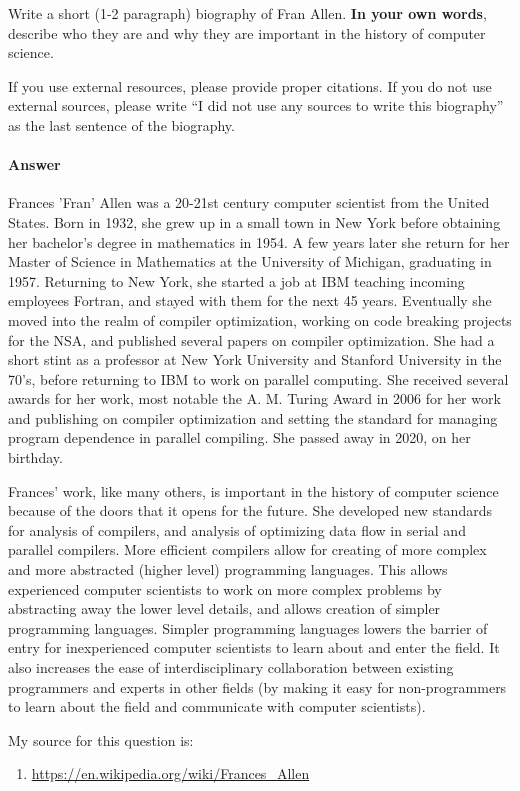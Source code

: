 \documentclass{article}
\begin{document}
\collab{}

Write a short (1-2 paragraph) biography of Fran Allen.
\textbf{In your own words}, describe who they are and why they are important in
the history of computer science.

If you use external resources, please provide
proper citations. If you do not use external sources, please write ``I did not
use any sources to write this biography'' as the last sentence of the
biography.

\paragraph{Answer}

Frances 'Fran' Allen was a 20-21st century computer scientist from the United States. Born in 1932, she grew up in a small town in New York before obtaining her bachelor's degree in mathematics in 1954. A few years later she return for her Master of Science in Mathematics at the University of Michigan, graduating in 1957. Returning to New York, she started a job at IBM teaching incoming employees Fortran, and stayed with them for the next 45 years. Eventually she moved into the realm of compiler optimization, working on code breaking projects for the NSA, and published several papers on compiler optimization. She had a short stint as a professor at New York University and Stanford University in the 70's, before returning to IBM to work on parallel computing. She received several awards for her work, most notable the A. M. Turing Award in 2006 for her work and publishing on compiler optimization and setting the standard for managing program dependence in parallel compiling. She passed away in 2020, on her birthday.

Frances' work, like many others, is important in the history of computer science because of the doors that it opens for the future. She developed new standards for analysis of compilers, and analysis of optimizing data flow in serial and parallel compilers. More efficient compilers allow for creating of more complex and more abstracted (higher level) programming languages. This allows experienced computer scientists to work on more complex problems by abstracting away the lower level details, and allows creation of simpler programming languages. Simpler programming languages lowers the barrier of entry for inexperienced computer scientists to learn about and enter the field. It also increases the ease of interdisciplinary collaboration between existing programmers and experts in other fields (by making it easy for non-programmers to learn about the field and communicate with computer scientists).

My source for this question is:
\begin{enumerate}
    \item \url{https://en.wikipedia.org/wiki/Frances_Allen}
\end{enumerate}


% 
% 
\end{document}

